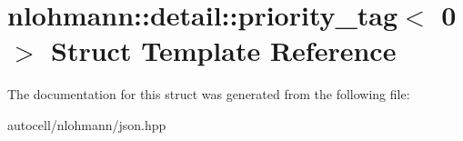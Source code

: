 \hypertarget{structnlohmann_1_1detail_1_1priority__tag_3_010_01_4}{}\section{nlohmann\+:\+:detail\+:\+:priority\+\_\+tag$<$ 0 $>$ Struct Template Reference}
\label{structnlohmann_1_1detail_1_1priority__tag_3_010_01_4}


The documentation for this struct was generated from the following file\+:\begin{DoxyCompactItemize}
\item 
autocell/nlohmann/json.\+hpp\end{DoxyCompactItemize}
